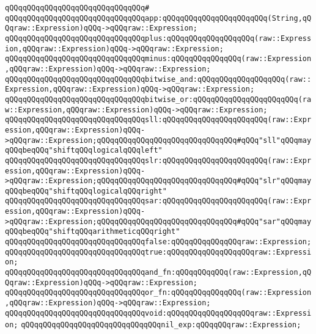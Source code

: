 \verb|qQQqqQQqqQQqqQQqqQQqqQQqqQQqqQQq#|\newline
\verb|qQQqqQQqqQQqqQQqqQQqqQQqqQQqqQQqapp:qQQqqQQqqQQqqQQqqQQqqQQq(String,qQQqraw::Expression)qQQq->qQQqraw::Expression;|\newline
\verb|qQQqqQQqqQQqqQQqqQQqqQQqqQQqqQQqplus:qQQqqQQqqQQqqQQqqQQq(raw::Expression,qQQqraw::Expression)qQQq->qQQqraw::Expression;|\newline
\verb|qQQqqQQqqQQqqQQqqQQqqQQqqQQqqQQqminus:qQQqqQQqqQQqqQQq(raw::Expression,qQQqraw::Expression)qQQq->qQQqraw::Expression;|\newline
\verb|qQQqqQQqqQQqqQQqqQQqqQQqqQQqqQQqbitwise_and:qQQqqQQqqQQqqQQqqQQq(raw::Expression,qQQqraw::Expression)qQQq->qQQqraw::Expression;|\newline
\verb|qQQqqQQqqQQqqQQqqQQqqQQqqQQqqQQqbitwise_or:qQQqqQQqqQQqqQQqqQQqqQQq(raw::Expression,qQQqraw::Expression)qQQq->qQQqraw::Expression;|\newline
\verb|qQQqqQQqqQQqqQQqqQQqqQQqqQQqqQQqsll:qQQqqQQqqQQqqQQqqQQqqQQq(raw::Expression,qQQqraw::Expression)qQQq->qQQqraw::Expression;qQQqqQQqqQQqqQQqqQQqqQQqqQQqqQQq#qQQq"sll"qQQqmayqQQqbeqQQq"shiftqQQqlogicalqQQqleft"|\newline
\verb|qQQqqQQqqQQqqQQqqQQqqQQqqQQqqQQqslr:qQQqqQQqqQQqqQQqqQQqqQQq(raw::Expression,qQQqraw::Expression)qQQq->qQQqraw::Expression;qQQqqQQqqQQqqQQqqQQqqQQqqQQqqQQq#qQQq"slr"qQQqmayqQQqbeqQQq"shiftqQQqlogicalqQQqright"|\newline
\verb|qQQqqQQqqQQqqQQqqQQqqQQqqQQqqQQqsar:qQQqqQQqqQQqqQQqqQQqqQQq(raw::Expression,qQQqraw::Expression)qQQq->qQQqraw::Expression;qQQqqQQqqQQqqQQqqQQqqQQqqQQqqQQq#qQQq"sar"qQQqmayqQQqbeqQQq"shiftqQQqarithmeticqQQqright"|\newline
\verb|qQQqqQQqqQQqqQQqqQQqqQQqqQQqqQQqfalse:qQQqqQQqqQQqqQQqraw::Expression;|\newline
\verb|qQQqqQQqqQQqqQQqqQQqqQQqqQQqqQQqtrue:qQQqqQQqqQQqqQQqqQQqraw::Expression;|\newline
\verb|qQQqqQQqqQQqqQQqqQQqqQQqqQQqqQQqand_fn:qQQqqQQqqQQq(raw::Expression,qQQqraw::Expression)qQQq->qQQqraw::Expression;|\newline
\verb|qQQqqQQqqQQqqQQqqQQqqQQqqQQqqQQqor_fn:qQQqqQQqqQQqqQQq(raw::Expression,qQQqraw::Expression)qQQq->qQQqraw::Expression;|\newline
\verb|qQQqqQQqqQQqqQQqqQQqqQQqqQQqqQQqvoid:qQQqqQQqqQQqqQQqqQQqraw::Expression;|\newline
\verb|qQQqqQQqqQQqqQQqqQQqqQQqqQQqqQQqnil_exp:qQQqqQQqraw::Expression;|\newline

